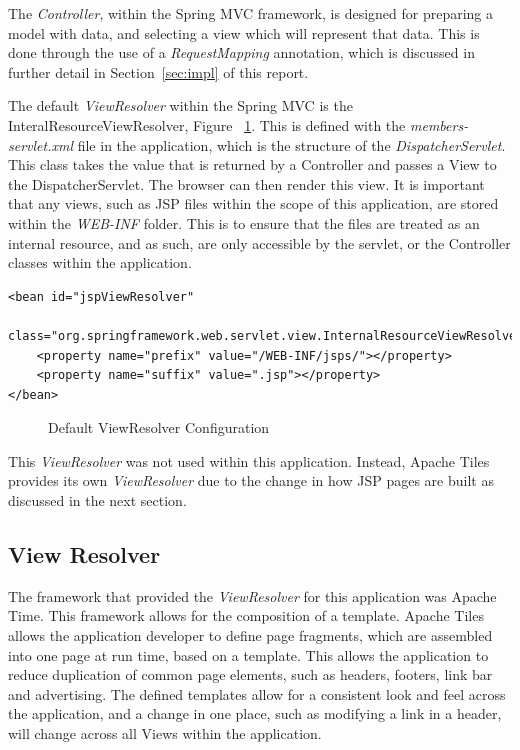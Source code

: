 The \textit{Controller}, within the Spring MVC framework, is designed for preparing a model with data, and selecting a view which will represent that data. This is done through the use of a \textit{RequestMapping} annotation, which is discussed in further detail in Section~\ref{sec:impl} of this report.

The default \textit{ViewResolver} within the Spring MVC is the InteralResourceViewResolver, Figure ~\ref{fig:defaultViewRes}. This is defined with the \textit{members-servlet.xml} file in the application, which is the structure of the \textit{DispatcherServlet}. This class takes the value that is returned by a Controller and passes a View to the DispatcherServlet. The browser can then render this view. It is important that any views, such as JSP files within the scope of this application, are stored within the \textit{WEB-INF} folder. This is to ensure that the files are treated as an internal resource, and as such, are only accessible by the servlet, or the Controller classes within the application.

\begin{lstlisting}
<bean id="jspViewResolver"
	class="org.springframework.web.servlet.view.InternalResourceViewResolver">
	<property name="prefix" value="/WEB-INF/jsps/"></property>
	<property name="suffix" value=".jsp"></property>
</bean>
\end{lstlisting}
\begin{figure}[H]
\caption{Default ViewResolver Configuration}
\label{fig:defaultViewRes}
\end{figure}

This \textit{ViewResolver} was not used within this application. Instead, Apache Tiles provides its own \textit{ViewResolver} due to the change in how JSP pages are built as discussed in the next section.

\subsection{View Resolver}

The framework that provided the \textit{ViewResolver} for this application was Apache Time. This framework allows for the composition of a template. Apache Tiles allows the application developer to define page fragments, which are assembled into one page at run time, based on a template. This allows the application to reduce duplication of common page elements, such as headers, footers, link bar and advertising.  The defined templates allow for a consistent look and feel across the application, and a change in one place, such as modifying a link in a header, will change across all Views within the application.

